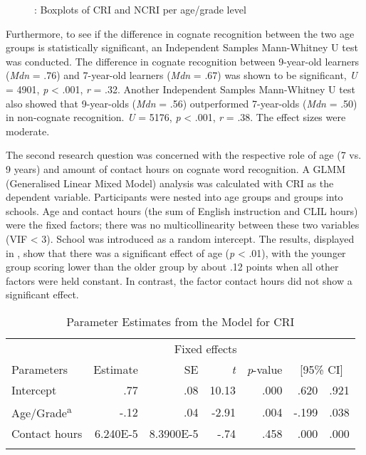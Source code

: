 \documentclass[output=paper,modfonts,nonflat,newtxmath]{langsci/langscibook}
\begin{document}
\begin{figure}
\caption{\label{fig:munoz:1}: Boxplots of CRI and NCRI per age/grade level}
\end{figure}

 {Furthermore, to see if the difference in cognate recognition between the two age groups is statistically significant, an Independent Samples Mann-Whitney U test was conducted. The difference in cognate recognition between 9-year-old learners (}{\textit{Mdn}} {= .76) and 7-year-old learners (}{\textit{Mdn}} {= .67) was shown to be significant,} {\textit{U}} {= 4901,} {\textit{p} }{< .001,} {\textit{r} }{= .32.  Another Independent Samples Mann-Whitney U test also showed that 9-year-olds (}{\textit{Mdn}} {= .56) outperformed 7-year-olds (}{\textit{Mdn}} {= .50) in non-cognate recognition.}{ \textit{U}} {= 5176,} {\textit{p} }{< .001,} {\textit{r} }{= .38. The effect sizes were moderate.}

 {The second research question was concerned with the respective role of age (7 vs. 9 years) and amount of contact hours on cognate word recognition. A GLMM (Generalised Linear Mixed Model) analysis was calculated with CRI as the dependent variable. Participants were nested into age groups and groups into schools. Age and contact hours (the sum of English instruction and CLIL hours) were the fixed factors; there was no multicollinearity between these two variables (VIF < 3). School was introduced as a random intercept. The results, displayed in , show that there was a significant effect of age (}{\textit{p}} {< .01), with the younger group scoring lower than the older group by about .12 points when all other factors were held constant. In contrast, the factor contact hours did not show a significant effect.}

\begin{table}
\caption{Parameter Estimates from the Model for CRI}
\label{tab:munoz:2}

\begin{tabularx}{\textwidth}{Xrrrrrr}
\lsptoprule
    & \multicolumn{5}{c}{{Fixed effects}}\\
\cmidrule{2-7}
Parameters & Estimate & SE & {\itshape t} & { {\textit{p}}{{}-value}} & \multicolumn{2}{c}{ [95\% CI]}\\
\midrule
Intercept & .77 & .08 & 10.13 & .000 & .620 & .921\\
Age/Grade\textsuperscript{a} & -.12 & .04 & -2.91 & .004 & {-.199} & .038\\
Contact hours &  6.240E-5 & 8.3900E-5 & -.74 & .458 & .000 & .000\\
\lspbottomrule
\end{tabularx}
\end{table}
\end{document}
